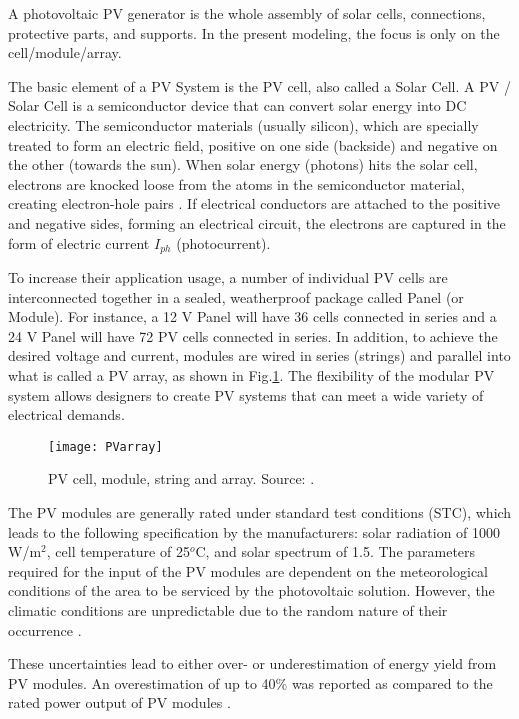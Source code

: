 A photovoltaic PV generator is the whole assembly of solar cells, connections, protective parts, and supports. In the present modeling, the focus is only on the cell/module/array.
 
The basic element of a PV System is the PV cell, also called a Solar Cell. A PV / Solar Cell is a semiconductor device that can convert solar energy into DC electricity. The semiconductor materials (usually silicon), which are specially treated to form an electric field, positive on one side (backside) and negative on the other (towards the sun). When solar energy (photons) hits the solar cell, electrons are knocked loose from the atoms in the semiconductor material, creating electron-hole pairs \cite{Lorenzo}. If electrical conductors are attached to the positive and negative sides, forming an electrical circuit, the electrons are captured in the form of electric current $ I_{ph} $ (photocurrent).
 
To increase their application usage, a number of individual PV cells are interconnected together in a sealed, weatherproof package called Panel (or Module). For instance, a 12 V Panel will have 36 cells connected in series and a 24 V Panel will have 72 PV cells connected in series. In addition, to achieve the desired voltage and current, modules are wired in series (strings) and parallel into what is called a PV array, as shown in Fig.\ref{fig:celmodarray}. The flexibility of the modular PV system allows designers to create PV systems that can meet a wide variety of electrical demands. 

\begin{figure}[h]
\texttt{[image: PVarray]}
\centering
\caption{PV cell, module, string and array. Source: \cite{SamlexSolar}.}
\label{fig:celmodarray}
\end{figure}

The PV modules are generally rated under standard test conditions (STC), which leads to the following specification by the manufacturers:  solar radiation of 1000 W/m$^{2}$, cell temperature of 25$^{o}$C, and solar spectrum of 1.5. The parameters required for the input of the PV modules are dependent on the meteorological conditions of the area to be serviced by the photovoltaic solution. However, the climatic conditions are unpredictable due to the random nature of their occurrence \cite{Jakhrani}.
 
These uncertainties lead to either over- or underestimation of energy yield from PV modules. An overestimation of up to 40\% was reported as compared to the rated power output of PV modules \cite{Durisch}. 

